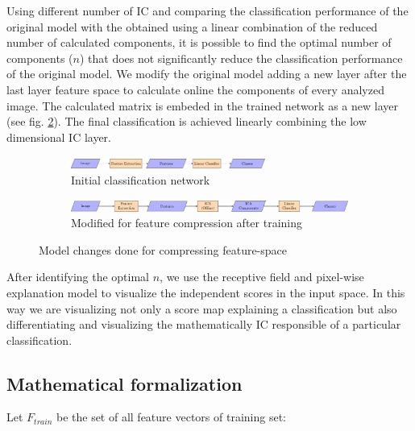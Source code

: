 \documentclass[review]{elsarticle}
\theoremstyle{definition} %
\theoremstyle{remark}
\begin{document}
 Using different number of IC and comparing the classification performance of the original model with the obtained using a linear combination of the reduced number of calculated components, it is possible to find the optimal number of components ($n$) that does not significantly reduce the classification performance of the original model. We modify the original model adding a new layer after the last layer feature space to calculate online the components of every analyzed image. The calculated matrix is embeded in the trained network as a new layer (see fig. \ref{fig:models}). The final classification is achieved linearly combining the low dimensional IC layer. 

\begin{figure}[h!]
	\centering
	\begin{subfigure}[b]{\textwidth}
		\centering
		\includegraphics[width=0.7\textwidth]{./figures/initial_classifier.pdf}
		\caption{Initial classification network}	
	\end{subfigure}
	\hfill   
	\begin{subfigure}[b]{\textwidth}
		\centering
		\includegraphics[width=\textwidth]{./figures/ica_classifier.pdf}
		\caption{Modified for feature compression after training}
		\label{fig:models_ica}
	\end{subfigure}
	\caption{Model changes done for compressing feature-space}  
	\label{fig:models} 
\end{figure}

After identifying the optimal $n$, we use the receptive field and pixel-wise explanation model \cite{de2017deep} to visualize the independent scores in the input space. In this way we are visualizing not only a score map explaining a classification but also differentiating and visualizing the mathematically IC responsible of a particular classification. 

\subsection{Mathematical formalization}

Let $F_{train}$ be the set of all feature vectors of training set:
\end{document}
